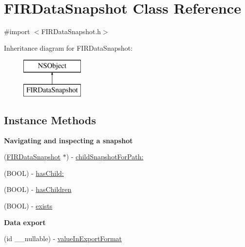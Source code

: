 \hypertarget{interface_f_i_r_data_snapshot}{}\section{F\+I\+R\+Data\+Snapshot Class Reference}
\label{interface_f_i_r_data_snapshot}


{\ttfamily \#import $<$F\+I\+R\+Data\+Snapshot.\+h$>$}

Inheritance diagram for F\+I\+R\+Data\+Snapshot\+:\begin{figure}[H]
\begin{center}
\leavevmode
\includegraphics[height=2.000000cm]{interface_f_i_r_data_snapshot}
\end{center}
\end{figure}
\subsection*{Instance Methods}
\begin{Indent}{\bf Navigating and inspecting a snapshot}\par
\begin{DoxyCompactItemize}
\item 
(\hyperlink{interface_f_i_r_data_snapshot}{F\+I\+R\+Data\+Snapshot} $\ast$) -\/ \hyperlink{interface_f_i_r_data_snapshot_ad42cd676b4f064b1daa0443d1e049cce}{child\+Snapshot\+For\+Path\+:}
\item 
(B\+O\+O\+L) -\/ \hyperlink{interface_f_i_r_data_snapshot_a4f8f0a5933f6a71ca7f2668b9c153f39}{has\+Child\+:}
\item 
(B\+O\+O\+L) -\/ \hyperlink{interface_f_i_r_data_snapshot_a704cfafea937d4224e3fb38efccd9b1a}{has\+Children}
\item 
(B\+O\+O\+L) -\/ \hyperlink{interface_f_i_r_data_snapshot_af14cbacf7ef15cf8c31196bc03e9db09}{exists}
\end{DoxyCompactItemize}
\end{Indent}
\begin{Indent}{\bf Data export}\par
\begin{DoxyCompactItemize}
\item 
(id \+\_\+\+\_\+nullable) -\/ \hyperlink{interface_f_i_r_data_snapshot_adef69c02e06e3090bb19a67dc52db136}{value\+In\+Export\+Format}
\end{DoxyCompactItemize}
\end{Indent}
